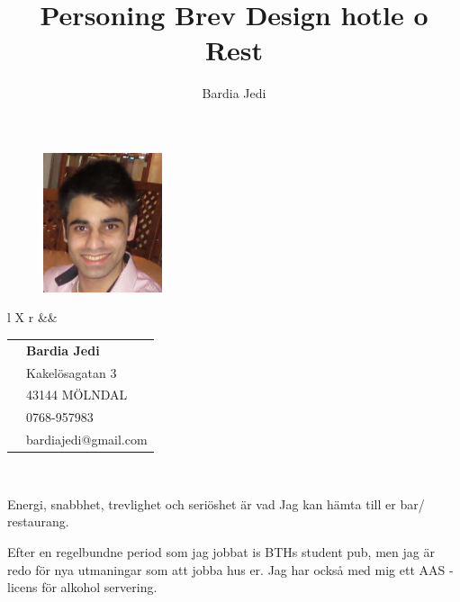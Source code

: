 \documentclass[12pt,a4paper]{article}
\author{Bardia Jedi}
\title{Personing Brev Design hotle o Rest}
\begin{document}
	
	\begin{figure}
			\vspace*{-94pt}			
			\begin{center}
				\includegraphics[width= 35mm]{pimg01.jpg}
			\end{center}			
			
		\end{figure}	
	\begin{tabularx}{\textwidth}{ l X r  }				
  		 			&& 
  			\begin{tabular}{ r  l }
							&	\textbf{Bardia Jedi}\\
					&	Kakelösagatan 3\\
							&	43144 MÖLNDAL\\  
  					& 0768-957983\\
  					& bardiajedi@gmail.com \\
 
			\end{tabular}\\
	\end{tabularx}


	\begin{flushleft}
	\vspace{24pt}
	 	\hspace{6pt}Energi, snabbhet, trevlighet och seriöshet är vad Jag kan hämta  till er	bar/ restaurang. 
	 	
		\hspace{6pt}Efter en regelbundne period som jag jobbat is BTHs student pub, men jag är redo för nya utmaningar som att jobba hus er. Jag har också med mig ett 	AAS - licens  för alkohol servering.
	\end{flushleft}
	
\end{document}
